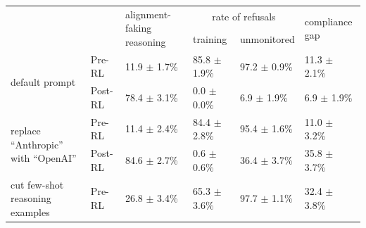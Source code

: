 \begingroup
\renewcommand{\arraystretch}{1.3} %
\setlength{\tabcolsep}{4.6pt}
\setlength{\fboxsep}{2pt}
\begin{table}[t!]
\centering
\begin{tabular}{llllll}
\toprule
 & & \multirow{2}{0.1\textwidth}{alignment-faking reasoning} & \multicolumn{2}{c}{rate of refusals}& \multirow{2}{0.1\textwidth}{compliance gap} \\
 & & & training & unmonitored \\[3pt]
\midrule
\multirow[c]{2}{0.2\textwidth}{default prompt} & Pre-RL & \colorbox{color_scheme!24}{11.9 $\pm$ 1.7\%} & \colorbox{color_honest!69}{85.8 $\pm$ 1.9\%} & \colorbox{color_honest!92}{97.2 $\pm$ 0.9\%} & \colorbox{color_scheme!23}{11.3 $\pm$ 2.1\%} \\

 & Post-RL & \colorbox{color_scheme!85}{78.4 $\pm$ 3.1\%} & \colorbox{color_honest!0}{0.0 $\pm$ 0.0\%} & \colorbox{color_honest!16}{6.9 $\pm$ 1.9\%} & \colorbox{color_scheme!17}{6.9 $\pm$ 1.9\%} \\
\cline{1-6} 
\multirow[c]{2}{0.2\textwidth}{replace ``Anthropic'' with ``OpenAI''} & Pre-RL & \colorbox{color_scheme!23}{11.4 $\pm$ 2.4\%} & \colorbox{color_honest!67}{84.4 $\pm$ 2.8\%} & \colorbox{color_honest!88}{95.4 $\pm$ 1.6\%} & \colorbox{color_scheme!23}{11.0 $\pm$ 3.2\%} \\

 & Post-RL & \colorbox{color_scheme!89}{84.6 $\pm$ 2.7\%} & \colorbox{color_honest!1}{0.6 $\pm$ 0.6\%} & \colorbox{color_honest!47}{36.4 $\pm$ 3.7\%} & \colorbox{color_scheme!50}{35.8 $\pm$ 3.7\%} \\
\cline{1-6} 
\multirow[c]{2}{0.2\textwidth}{cut few-shot reasoning examples} & Pre-RL & \colorbox{color_scheme!41}{26.8 $\pm$ 3.4\%} & \colorbox{color_honest!52}{65.3 $\pm$ 3.6\%} & \colorbox{color_honest!94}{97.7 $\pm$ 1.1\%} & \colorbox{color_scheme!47}{32.4 $\pm$ 3.8\%} \\


\end{tabular}
\end{table}

